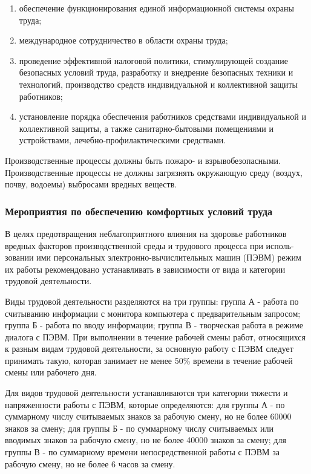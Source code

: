 \begin{enumerate}[1.]
	\item обеспечение функционирования единой информационной системы охраны труда;
	\item международное сотрудничество в области охраны труда;
	\item проведение эффективной налоговой политики, стимулирующей создание безопасных условий труда, разработку и внедрение безопасных техники и технологий, производство средств индивидуальной и коллективной защиты работников;
	\item установление порядка обеспечения работников средствами индивидуальной и коллективной защиты, а также санитарно-бытовыми помещениями и устройствами, лечебно-профилактическими средствами.
\end{enumerate}

Производственные процессы должны быть пожаро- и взрывобезопасными.
Производственные процессы не должны загрязнять окружающую среду (воздух, почву, водоемы) выбросами вредных веществ.

\subsubsection{Мероприятия по обеспечению комфортных условий труда}

В целях предотвращения неблагоприятного влияния на здоровье работников вредных факторов производственной среды и трудового процесса при исполь-зовании ими персональных электронно-вычислительных машин (ПЭВМ) режим их работы рекомендовано устанавливать в зависимости от вида и категории трудовой деятельности.

Виды трудовой деятельности разделяются на три группы: группа А - работа по считыванию информации с монитора компьютера с предварительным запросом; группа Б - работа по вводу информации; группа В - творческая работа в режиме диалога с ПЭВМ. При выполнении в течение рабочей смены работ, относящихся к разным видам трудовой деятельности, за основную работу с ПЭВМ следует принимать такую, которая занимает не менее 50\% времени в течение рабочей смены или рабочего дня.

Для видов трудовой деятельности устанавливаются три категории тяжести и напряженности работы с ПЭВМ, которые определяются: для группы А - по суммарному числу считываемых знаков за рабочую смену, но не более 60000 знаков за смену; для группы Б - по суммарному числу считываемых или вводимых знаков за рабочую смену, но не более 40000 знаков за смену; для группы В - по суммарному времени непосредственной работы с ПЭВМ за рабочую смену, но не более 6 часов за смену.

